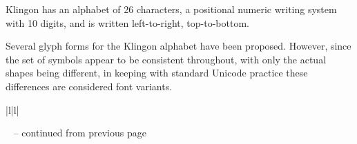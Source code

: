 \documentclass[a4paper,8pt,english]{sphinxmanual}
\begin{document}
Klingon has an alphabet of 26 characters, a positional numeric writing
system with 10 digits, and is written left-to-right, top-to-bottom.

Several glyph forms for the Klingon alphabet have been proposed.
However, since the set of symbols appear to be consistent throughout,
with only the actual shapes being different, in keeping with standard
Unicode practice these differences are considered font variants.

\begin{longtable}{|l|l|}
\hline
\endfirsthead

%
{{\textsf{\tablename\ \thetable{} -- continued from previous page}}} \\
\hline
\endhead

\hline {} \\ \hline
\endfoot

\endlastfoot



\end{longtable}
\end{document}
